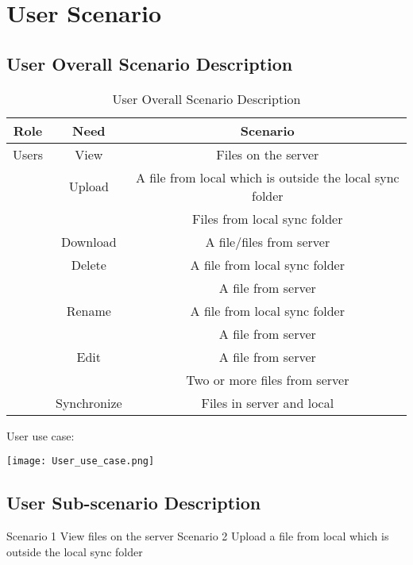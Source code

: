 \section{User Scenario}
\subsection{User Overall Scenario Description}

\begin{table}[H]
\centering
\caption{User Overall Scenario Description}
\begin{tabular}{|c|c|c|}
\hline
Role & Need & Scenario\\
\hline
{Users} & View & Files on the server \\
\cline{2-3}
& Upload  & A file from local which is outside the local sync folder \\
\cline{3-3}
& {} & Files from local sync folder\\
\cline{2-3}
&Download & A file/files from server\\
\cline{2-3}
&Delete & A file from local sync folder\\
\cline{3-3}
&{} & A file from server\\
\cline{2-3}
&Rename & A file from local sync folder\\
\cline{3-3}
&{} & A file from server\\
\cline{2-3}
&Edit & A file from server\\
\cline{3-3}
&{} & Two or more files from server\\
\cline{2-3}
&Synchronize & Files in server and local\\
\hline
\bottomrule
\end{tabular}
\end{table}

User use case:\\
\begin{minipage}
\centering
\texttt{[image: User\_use\_case.png]}

\label{fig:User use case}
\end{minipage}

\subsection{User Sub-scenario Description}
Scenario 1 View files on the server\newline
Scenario 2 Upload a file from local which is outside the local sync folder\newline
